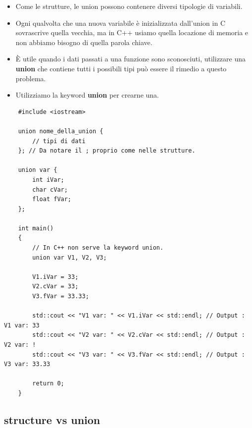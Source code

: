 \begin{itemize}
	\item \textsf{\small Come le strutture, le union possono contenere diversi tipologie di variabili.}
	\item \textsf{\small Ogni qualvolta che una nuova variabile è inizializzata dall'union in C sovrascrive quella vecchia, ma in C++ usiamo quella locazione di memoria e non abbiamo bisogno di quella parola chiave.} %
	\item \textsf{\small È utile quando i dati passati a una funzione sono sconosciuti, utilizzare una \textbf{union} che contiene tutti i possibili tipi può essere il rimedio a questo problema.}
	\item \textsf{\small Utilizziamo la keyword \textbf{union} per crearne una.}
\end{itemize}

\begin{lstlisting}
	#include <iostream>
	
	union nome_della_union {
		// tipi di dati
	}; // Da notare il ; proprio come nelle strutture.

	union var {
		int iVar;
		char cVar;
		float fVar;
	};

	int main()
	{
		// In C++ non serve la keyword union.
		union var V1, V2, V3;
		
		V1.iVar = 33;
		V2.cVar = 33;
		V3.fVar = 33.33;
		
		std::cout << "V1 var: " << V1.iVar << std::endl; // Output : V1 var: 33
		std::cout << "V2 var: " << V2.cVar << std::endl; // Output : V2 var: !
		std::cout << "V3 var: " << V3.fVar << std::endl; // Output : V3 var: 33.33
		
		return 0;
	}
\end{lstlisting}

\subsection{structure vs union}


